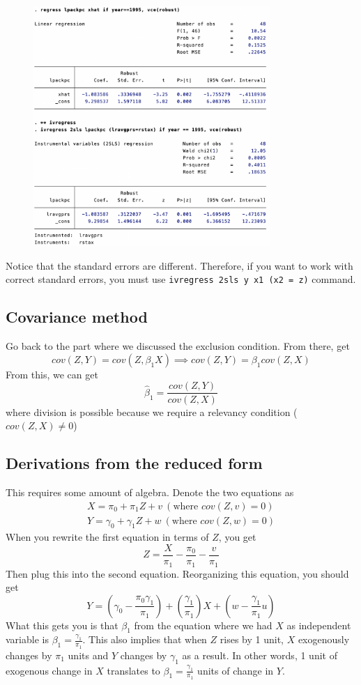 \begin{figure}[H]
\centering
\includegraphics[width=0.8\textwidth,keepaspectratio]{ivregress.png}
\end{figure}
Notice that the standard errors are different. Therefore, if you want to work with correct standard errors, you must use \texttt{ivregress 2sls y x1 (x2 = z)} command.
\subsection{Covariance method}
Go back to the part where we discussed the exclusion condition. From there, get
\[
cov(Z,Y)=cov(Z,\beta_1X) \implies cov(Z,Y)=\beta_1cov(Z,X)
\]
From this, we can get
\[
\hat{\beta}_1=\frac{cov(Z,Y)}{cov(Z,X)}
\]
where division is possible because we require a relevancy condition ($cov(Z,X)\neq0$)
\subsection{Derivations from the reduced form}
This requires some amount of algebra. Denote the two equations as
\begin{gather*}
X=\pi_0+\pi_1Z+v \ (\text{where }cov(Z,v)=0)\\ Y=\gamma_0+\gamma_1Z+w \ (\text{where }cov(Z,w)=0)
\end{gather*}
When you rewrite the first equation in terms of $Z$, you get
\[
Z=\frac{X}{\pi_1}-\frac{\pi_0}{\pi_1}-\frac{v}{\pi_1}
\]
Then plug this into the second equation. Reorganizing this equation, you should get
\[
Y=\left(\gamma_0-\frac{\pi_0\gamma_1}{\pi_1}\right)+\left(\frac{\gamma_1}{\pi_1}\right)X+\left(w-\frac{\gamma_1}{\pi_1}u\right)
\]
What this gets you is that $\beta_1$ from the equation where we had $X$ as independent variable is $\beta_1 = \frac{\gamma_1}{\pi_1}$. This also implies that when $Z$ rises by 1 unit, $X$ exogenously changes by $\pi_1$ units and $Y$ changes by $\gamma_1$ as a result. In other words, 1 unit of exogenous change in $X$ translates to  $\beta_1 = \frac{\gamma_1}{\pi_1}$ units of change in $Y$. \par\medskip



